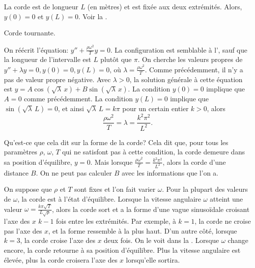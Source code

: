 La corde  est de longueur $L$ (en mètres) et est fixée aux deux extrémités. Alors, $y(0) = 0$ et $y(L) = 0$.  Voir la .

\begin{myfig}
\capstart
{}
\caption{Corde tournante.\label{bvp:whirstringfig}}
\end{myfig}

On réécrit l'équation: 
$y'' + \frac{\rho \omega^2}{T} y = 0$.
La configuration est semblable à l', sauf que  
la longueur de l'intervalle est $L$ plutôt que $\pi$. On cherche les valeurs propres de  $y'' + \lambda y = 0, y(0) = 0, y(L) = 0$, où
$\lambda = \frac{\rho \omega^2}{T}$.  Comme précédemment, il n'y a pas de valeur propre négative. Avec $\lambda > 0$,
la solution générale à cette équation est $y = A \cos (  \sqrt{\lambda} \,x ) + B
\sin ( \sqrt{\lambda} \,x )$.  La condition $y(0) = 0$ implique que $A = 0$ comme précédemment. La condition $y(L) = 0$ implique que
$\sin ( \sqrt{\lambda} \, L) = 0$, et ainsi
$\sqrt{\lambda} \, L = k \pi$  pour un certain entier $k > 0$, alors
\begin{equation*}
\frac{\rho \omega^2}{T} = \lambda = \frac{k^2 \pi^2}{L^2} .
\end{equation*}

Qu'est-ce que cela dit sur la forme de la corde? Cela dit que, pour tous les paramètres $\rho$, $\omega$, $T$ qui ne satisfont pas à cette condition, la corde demeure dans sa position d'équilibre, $y=0$.  Mais lorsque 
$\frac{\rho \omega^2}{T} = \frac{k^2 \pi^2}{L^2}$, alors la corde  d'une distance $B$. On ne peut pas calculer $B$ avec les informations que l'on a. 

On suppose que  $\rho$ et $T$ sont fixes et l'on fait varier $\omega$.
Pour la plupart des valeurs de $\omega$, la corde est à l'état d'équilibre. Lorsque la vitesse angulaire  $\omega$ atteint une valeur $\omega = \frac{k \pi \sqrt{T}}{L\sqrt{\rho}}$, alors la corde sort et a la forme d'une vague sinusoïdale croisant l'axe des 
$x$ $k-1$ fois entre les extrémités. Par exemple, à $k=1$, la corde ne croise pas l'axe des $x$, et la forme ressemble à la  plus haut.
D'un autre côté, lorsque  $k=3$, la corde croise l'axe des $x$ deux fois. On le voit dans la  .
Lorsque $\omega$ change encore, la corde retourne à sa position d'équilibre. Plus la vitesse angulaire est élevée, plus la corde croisera l'axe des  $x$ lorsqu'elle sortira.

